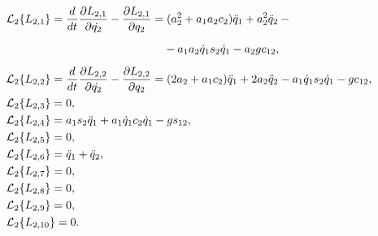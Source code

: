 \begin{align}
    &\mathcal{L}_2 \{ L_{2,1} \} = \frac{d}{dt}\frac{\partial L_{2,1}}{\partial\dot{q_2}} - \frac{\partial L_{2,1}}{\partial q_2} = (a_2^2 + a_1 a_2 c_2) \ddot{q}_1 +  a_2^2 \ddot{q}_2 - {} \notag
    \\
    &\phantom{\mathcal{L}_2 \{ L_{2,1} \} = \frac{d}{dt}\frac{\partial L_{2,1}}{\partial\dot{q_2}} - \frac{\partial L_{2,1}}{\partial q_2} =} - a_1 a_2 \dot{q}_1 s_2 \dot{q}_1 - a_2 g c_{12},
    \\
    & \mathcal{L}_2 \{ L_{2,2} \} = \frac{d}{dt}\frac{\partial L_{2,2}}{\partial\dot{q_2}} - \frac{\partial L_{2,2}}{\partial q_2} = (2 a_2 + a_1 c_2) \ddot{q}_1 + 2 a_2 \ddot{q}_2 - a_1 \dot{q}_1 s_2 \dot{q}_1 - g c_{12},
    \\
    & \mathcal{L}_2 \{ L_{2,3} \} = 0,
    \\
    & \mathcal{L}_2 \{ L_{2,4} \} = a_1 s_2 \ddot{q}_1 + a_1 \dot{q}_1 c_2 \dot{q}_1 - g s_{12},
    \\
    & \mathcal{L}_2 \{ L_{2,5} \} = 0,
    \\
    & \mathcal{L}_2 \{ L_{2,6} \} = \ddot{q}_1 + \ddot{q}_2,
    \\
    & \mathcal{L}_2 \{ L_{2,7} \} = 0,
    \\
    & \mathcal{L}_2 \{ L_{2,8} \} = 0,
    \\
    & \mathcal{L}_2 \{ L_{2,9} \} = 0,
    \\
    & \mathcal{L}_2 \{ L_{2,10} \} = 0 \ldotp \label{eq_last_regr_comp_for_2}
\end{align}

